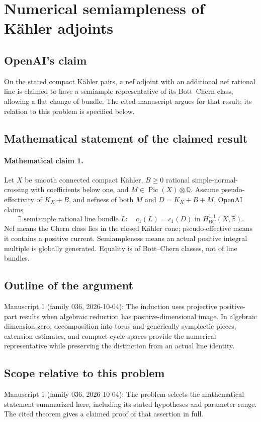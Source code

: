 \documentclass[11pt]{article}
\begin{document}
\section*{Numerical semiampleness of Kähler adjoints}

\subsection{OpenAI's claim}
On the stated compact Kähler pairs, a nef adjoint with an additional nef rational line is claimed to have a semiample representative of its Bott--Chern class, allowing a flat change of bundle. The cited manuscript argues for that result; its relation to this problem is specified below.

\subsection{Mathematical statement of the claimed result}
\paragraph{Mathematical claim 1.} Let $X$ be smooth connected compact Kähler, $B\ge0$ rational simple-normal-crossing with coefficients below one, and $M\in\operatorname{Pic}(X)\otimes\mathbb Q$. Assume pseudo-effectivity of $K_X+B$, and nefness of both $M$ and $D=K_X+B+M$, OpenAI claims
\[
\exists\text{ semiample rational line bundle }L:\quad c_1(L)=c_1(D)\text{ in }H^{1,1}_{\mathrm{BC}}(X,\mathbb R).
\]
Nef means the Chern class lies in the closed Kähler cone; pseudo-effective means it contains a positive current. Semiampleness means an actual positive integral multiple is globally generated. Equality is of Bott--Chern classes, not of line bundles.

\subsection{Outline of the argument}
Manuscript 1 (family 036, 2026-10-04): The induction uses projective positive-part results when algebraic reduction has positive-dimensional image. In algebraic dimension zero, decomposition into torus and generically symplectic pieces, extension estimates, and compact cycle spaces provide the numerical representative while preserving the distinction from an actual line identity.

\subsection{Scope relative to this problem}
Manuscript 1 (family 036, 2026-10-04): The problem selects the mathematical statement summarized here, including its stated hypotheses and parameter range. The cited theorem gives a claimed proof of that assertion in full.
\end{document}
